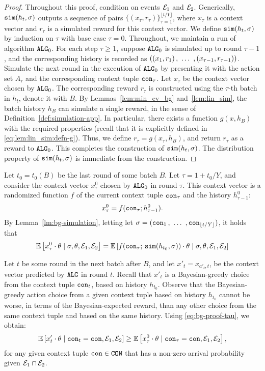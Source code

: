 \begin{proof}
Throughout this proof, condition on events $\mathcal{E}_1$ and $\mathcal{E}_2$. Generically,
$\mathtt{sim}(h_t,\sigma)$ outputs a sequence of pairs
    $\{(x_\tau, r_\tau)\}_{\tau=1}^{\lfloor t/Y \rfloor}$,
where $x_\tau$ is a context vector and $r_\tau$ is a simulated reward for this
context vector. We define $\mathtt{sim}(h_t,\sigma)$ by induction on $\tau$ with base case $\tau=0$. Throughout, we maintain a run of algorithm $\mathtt{ALG}_0$. For each step $\tau\geq 1$, suppose $\mathtt{ALG}_0$ is simulated up to round $\tau-1$, and the corresponding history is recorded as
    $((x_1,r_1) \, ,\ \ldots\ , (x_{\tau-1},r_{\tau-1}))$.
Simulate the next round in the execution of $\mathtt{ALG}_0$ by presenting it with the action set $A_\tau$ and the corresponding context tuple $\mathtt{con}_\tau$. Let $x_\tau$ be the context vector chosen by $\mathtt{ALG}_0$. The corresponding reward $r_\tau$ is constructed using the $\tau$-th batch in $h_t$, denote it with $B$. By Lemmas~\ref{lem:min_ev_bg} and~\ref{lem:lin_sim}, the batch history
$h_B$ can simulate a single reward, in the sense of
Definition~\ref{def:simulation-app}. In particular, there exists a function
$g(x,h_B)$ with the required properties (recall that it is explicitly defined in
\eqref{eq:lem:lin_sim:defn-g}). Thus, we define $r_\tau = g(x_\tau,h_B)$, and
return $r_\tau$ as a reward to $\mathtt{ALG}_0$. This completes the construction of
$\mathtt{sim}(h_t,\sigma)$. The distribution property of $\mathtt{sim}(h_t,\sigma)$ is immediate from the construction.
\end{proof}

Let $t_0 = t_0(B)$ be the last round of some batch $B$. Let $\tau = 1+t_0/Y$, and consider the context vector $x^0_\tau$ chosen by $\mathtt{ALG}_0$ in round $\tau$. This context vector is a randomized function $f$ of the current context tuple $\mathtt{con}_\tau$ and the history $h^0_{\tau-1}$:
    \[ x^0_\tau = f(\mathtt{con}_\tau; h^0_{\tau-1}).\]
By Lemma~\ref{lm:bg-simulation}, letting
    let $\sigma = (\mathtt{con}_1 \, ,\ \ldots\ , \mathtt{con}_{\lfloor t/Y \rfloor})$,
it holds that
\begin{align}\label{eq:bg-proof-tau}
 \mathbb{E}\left[ x^0_\tau \cdot \theta \;|\; \sigma,\theta,\mathcal{E}_1,\mathcal{E}_2\right]
    = \mathbb{E}\left[ f(\mathtt{con}_\tau;\,\mathtt{sim}(h_{t_0},\sigma)) \cdot \theta \;|\; \sigma,\theta,\mathcal{E}_1,\mathcal{E}_2\right]
\end{align}

Let $t$ be some round in the next batch after $B$, and let
    $x'_t = x_{a'_t,t}$,
be the context vector predicted by $\mathtt{ALG}$ in round $t$. Recall that $x'_t$ is a Bayesian-greedy choice from the context tuple $\mathtt{con}_t$, based on history $h_{t_0}$.
Observe that the Bayesian-greedy action choice from a given context tuple based on history $h_{t_0}$ cannot be worse, in terms of the Bayesian-expected reward, than any other choice from the same context tuple and based on the same history. Using \eqref{eq:bg-proof-tau}, we obtain:
\begin{align}\label{eq:bg-proof-MII-cond}
 \mathbb{E}\left[ x'_t \cdot \theta \;|\; \mathtt{con}_t = \mathtt{con},\mathcal{E}_1,\mathcal{E}_2  \right]
    \geq \mathbb{E}\left[ x^0_\tau \cdot \theta  \;|\; \mathtt{con}_\tau = \mathtt{con},\mathcal{E}_1,\mathcal{E}_2\right],
 \end{align}
 for any given context tuple $\mathtt{con}\in\mathtt{CON}$ that has a non-zero arrival probability given $\mathcal{E}_1 \cap\mathcal{E}_2$.

